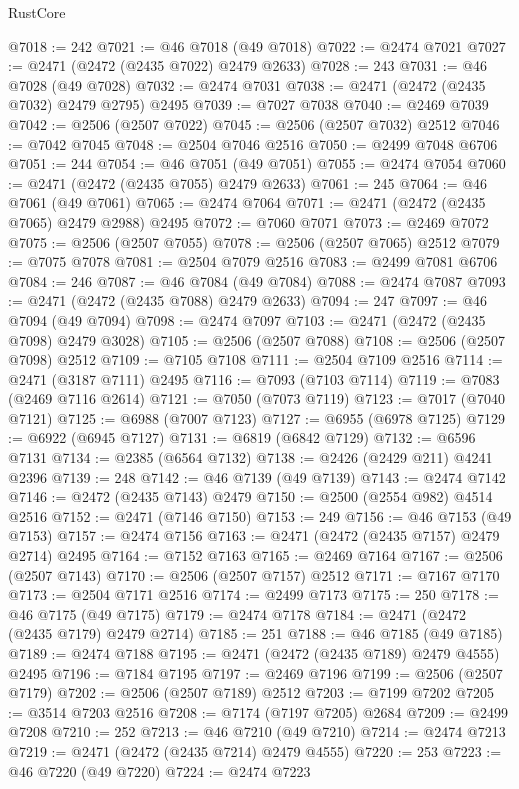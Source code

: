 \begin{lexlean}{RustCore}
\begin{coremodule}
@7018 := 242
@7021 := @46 @7018 (@49 @7018)
@7022 := @2474 @7021
@7027 := @2471 (@2472 (@2435 @7022) @2479 @2633)
@7028 := 243
@7031 := @46 @7028 (@49 @7028)
@7032 := @2474 @7031
@7038 := @2471 (@2472 (@2435 @7032) @2479 @2795) @2495
@7039 := @7027 @7038
@7040 := @2469 @7039
@7042 := @2506 (@2507 @7022)
@7045 := @2506 (@2507 @7032) @2512
@7046 := @7042 @7045
@7048 := @2504 @7046 @2516
@7050 := @2499 @7048 @6706
@7051 := 244
@7054 := @46 @7051 (@49 @7051)
@7055 := @2474 @7054
@7060 := @2471 (@2472 (@2435 @7055) @2479 @2633)
@7061 := 245
@7064 := @46 @7061 (@49 @7061)
@7065 := @2474 @7064
@7071 := @2471 (@2472 (@2435 @7065) @2479 @2988) @2495
@7072 := @7060 @7071
@7073 := @2469 @7072
@7075 := @2506 (@2507 @7055)
@7078 := @2506 (@2507 @7065) @2512
@7079 := @7075 @7078
@7081 := @2504 @7079 @2516
@7083 := @2499 @7081 @6706
@7084 := 246
@7087 := @46 @7084 (@49 @7084)
@7088 := @2474 @7087
@7093 := @2471 (@2472 (@2435 @7088) @2479 @2633)
@7094 := 247
@7097 := @46 @7094 (@49 @7094)
@7098 := @2474 @7097
@7103 := @2471 (@2472 (@2435 @7098) @2479 @3028)
@7105 := @2506 (@2507 @7088)
@7108 := @2506 (@2507 @7098) @2512
@7109 := @7105 @7108
@7111 := @2504 @7109 @2516
@7114 := @2471 (@3187 @7111) @2495
@7116 := @7093 (@7103 @7114)
@7119 := @7083 (@2469 @7116 @2614)
@7121 := @7050 (@7073 @7119)
@7123 := @7017 (@7040 @7121)
@7125 := @6988 (@7007 @7123)
@7127 := @6955 (@6978 @7125)
@7129 := @6922 (@6945 @7127)
@7131 := @6819 (@6842 @7129)
@7132 := @6596 @7131
@7134 := @2385 (@6564 @7132)
@7138 := @2426 (@2429 @211) @4241 @2396
@7139 := 248
@7142 := @46 @7139 (@49 @7139)
@7143 := @2474 @7142
@7146 := @2472 (@2435 @7143) @2479
@7150 := @2500 (@2554 @982) @4514 @2516
@7152 := @2471 (@7146 @7150)
@7153 := 249
@7156 := @46 @7153 (@49 @7153)
@7157 := @2474 @7156
@7163 := @2471 (@2472 (@2435 @7157) @2479 @2714) @2495
@7164 := @7152 @7163
@7165 := @2469 @7164
@7167 := @2506 (@2507 @7143)
@7170 := @2506 (@2507 @7157) @2512
@7171 := @7167 @7170
@7173 := @2504 @7171 @2516
@7174 := @2499 @7173
@7175 := 250
@7178 := @46 @7175 (@49 @7175)
@7179 := @2474 @7178
@7184 := @2471 (@2472 (@2435 @7179) @2479 @2714)
@7185 := 251
@7188 := @46 @7185 (@49 @7185)
@7189 := @2474 @7188
@7195 := @2471 (@2472 (@2435 @7189) @2479 @4555) @2495
@7196 := @7184 @7195
@7197 := @2469 @7196
@7199 := @2506 (@2507 @7179)
@7202 := @2506 (@2507 @7189) @2512
@7203 := @7199 @7202
@7205 := @3514 @7203 @2516
@7208 := @7174 (@7197 @7205) @2684
@7209 := @2499 @7208
@7210 := 252
@7213 := @46 @7210 (@49 @7210)
@7214 := @2474 @7213
@7219 := @2471 (@2472 (@2435 @7214) @2479 @4555)
@7220 := 253
@7223 := @46 @7220 (@49 @7220)
@7224 := @2474 @7223

\end{coremodule}
\end{lexlean}

